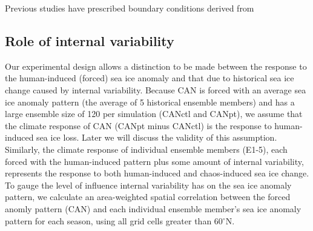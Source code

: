 \documentclass[twocol]{ametsoc}
\begin{document}
Previous studies have prescribed boundary conditions derived from


\subsection{Role of internal variability}
Our experimental design allows a distinction to be made between the response to the human-induced (forced) sea ice anomaly and that due to historical sea ice change caused by internal variability. Because CAN is forced with an average sea ice anomaly pattern (the average of 5 historical ensemble members) and has a large ensemble size of 120 per simulation (CANctl and CANpt), we assume that the climate response of CAN (CANpt minus CANctl) is the response to human-induced sea ice loss. Later we will discuss the validity of this assumption. Similarly, the climate response of individual ensemble members (E1-5), each forced with the human-induced pattern plus some amount of internal variability, represents the response to both human-induced and chaos-induced sea ice change. To gauge the level of influence internal variability has on the sea ice anomaly pattern, we calculate an area-weighted spatial correlation between the forced anomly pattern (CAN) and each individual ensemble member's sea ice anomaly pattern for each season, using all grid cells greater than 60$^\circ$N. 
\end{document}
